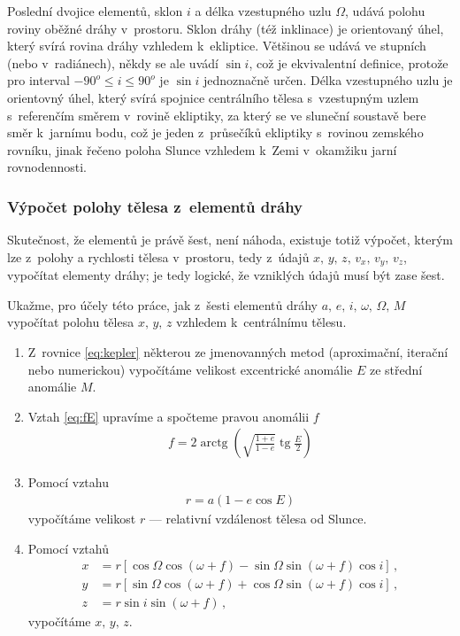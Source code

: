 \documentclass[A4paper, 12pt, oneside]{book}
\DeclareMathOperator{\tg}{tg}
\DeclareMathOperator{\arctg}{arctg}
\begin{document}
Poslední dvojice elementů, sklon $i$ a délka vzestupného uzlu $\Omega$, udává polohu roviny oběžné dráhy v~prostoru. Sklon dráhy (též inklinace) je orientovaný úhel, který svírá rovina dráhy vzhledem k~ekliptice. Většinou se udává ve stupních (nebo v~radiánech), někdy se ale uvádí $\sin i$, což je ekvivalentní definice, protože pro interval $-90^o\leq i \leq 90^o$ je $\sin i$ jednoznačně určen. Délka vzestupného uzlu je orientovný úhel, který svírá spojnice centrálního tělesa s~vzestupným uzlem s~referenčím směrem v~rovině ekliptiky, za který se ve sluneční soustavě bere směr k~jarnímu bodu, což je jeden z~průsečíků ekliptiky s~rovinou zemského rovníku, jinak řečeno poloha Slunce vzhledem k~Zemi v~okamžiku jarní rovnodennosti.

\subsubsection{Výpočet polohy tělesa z~elementů dráhy}
Skutečnost, že elementů je právě šest, není náhoda, existuje totiž výpočet, kterým lze z~polohy a rychlosti tělesa v~prostoru, tedy z~údajů $x,\, y,\, z,\, v_x,\, v_y,\, v_z$, vypočítat elementy dráhy; je tedy logické, že vzniklých údajů musí být zase šest. 

Ukažme, pro účely této práce, jak z~šesti elementů dráhy $a,\,e,\,i,\,\omega,\,\Omega,\,M$ vypočítat polohu tělesa $x,\, y,\, z$ vzhledem k~centrálnímu tělesu.

\begin{enumerate}[label=\arabic*.]
	\item Z~rovnice \eqref{eq:kepler} některou ze jmenovanných metod (aproximační, iterační nebo numerickou) vypočítáme velikost excentrické anomálie $E$ ze střední anomálie $M$.
	\item Vztah \eqref{eq:fE} upravíme a spočteme pravou anomálii $f$
		\begin{align}
			f = 2\arctg\left(\sqrt{\frac{1+e}{1-e}}\tg \frac{E}{2}\right)
		\end{align}
	\item Pomocí vztahu 
		\begin{align}
			r=a(1-e\cos E)
		\end{align}
		vypočítáme velikost $r$ --- relativní vzdálenost tělesa od Slunce.
	\item Pomocí vztahů
		\begin{align}
			x&=r\left[\cos\Omega\cos(\omega+f)-\sin\Omega\sin(\omega+f)\cos i\right]\,, \\
			y&=r\left[\sin\Omega\cos(\omega+f)+\cos\Omega\sin(\omega+f)\cos i\right]\,, \\
			z&=r\sin i\sin(\omega+f)\,,
		\end{align}
		vypočítáme $x,\,y,\,z$.
\end{enumerate}
\end{document}
